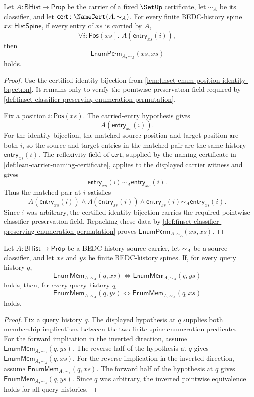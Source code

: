 \begin{theorem}
\label{thm:enumperm-identity-closure}
Let $A:\mathsf{BHist}\to\mathsf{Prop}$ be the carrier of a fixed $\SetUp$ certificate, let $\sim_A$ be its classifier, and let $\mathsf{cert}:\NameCert(A,\sim_A)$. For every finite BEDC-history spine $xs:\mathsf{HistSpine}$, if every entry of $xs$ is carried by $A$,
$$
\forall i:\mathsf{Pos}(xs).\;A(\mathsf{entry}_{xs}(i)),
$$
then
$$
\mathsf{EnumPerm}_{A,\sim_A}(xs,xs)
$$
holds.
\end{theorem}
\begin{proof}
Use the certified identity bijection from \autoref{lem:finset-enum-position-identity-bijection}. It remains only to verify the pointwise preservation field required by \autoref{def:finset-classifier-preserving-enumeration-permutation}.

Fix a position $i:\mathsf{Pos}(xs)$. The carried-entry hypothesis gives
$$
A(\mathsf{entry}_{xs}(i)).
$$
For the identity bijection, the matched source position and target position are both $i$, so the source and target entries in the matched pair are the same history $\mathsf{entry}_{xs}(i)$. The reflexivity field of $\mathsf{cert}$, supplied by the naming certificate in \autoref{def:lean-carrier-naming-certificate}, applies to the displayed carrier witness and gives
$$
\mathsf{entry}_{xs}(i)\sim_A\mathsf{entry}_{xs}(i).
$$
Thus the matched pair at $i$ satisfies
$$
A(\mathsf{entry}_{xs}(i))\land
A(\mathsf{entry}_{xs}(i))\land
\mathsf{entry}_{xs}(i)\sim_A\mathsf{entry}_{xs}(i).
$$
Since $i$ was arbitrary, the certified identity bijection carries the required pointwise classifier-preservation field. Repacking these data by \autoref{def:finset-classifier-preserving-enumeration-permutation} proves $\mathsf{EnumPerm}_{A,\sim_A}(xs,xs)$.
\end{proof}

\begin{lemma}
\label{lem:finset-enummem-pointwise-equivalence-symmetry}
Let $A:\mathsf{BHist}\to\mathsf{Prop}$ be a BEDC history source carrier, let $\sim_A$ be a source classifier, and let $xs$ and $ys$ be finite BEDC-history spines. If, for every query history $q$,
$$
\mathsf{EnumMem}_{A,\sim_A}(q,xs)
\Longleftrightarrow
\mathsf{EnumMem}_{A,\sim_A}(q,ys)
$$
holds, then, for every query history $q$,
$$
\mathsf{EnumMem}_{A,\sim_A}(q,ys)
\Longleftrightarrow
\mathsf{EnumMem}_{A,\sim_A}(q,xs)
$$
holds.
\end{lemma}
\begin{proof}
Fix a query history $q$. The displayed hypothesis at $q$ supplies both membership implications between the two finite-spine enumeration predicates. For the forward implication in the inverted direction, assume $\mathsf{EnumMem}_{A,\sim_A}(q,ys)$. The reverse half of the hypothesis at $q$ gives $\mathsf{EnumMem}_{A,\sim_A}(q,xs)$. For the reverse implication in the inverted direction, assume $\mathsf{EnumMem}_{A,\sim_A}(q,xs)$. The forward half of the hypothesis at $q$ gives $\mathsf{EnumMem}_{A,\sim_A}(q,ys)$. Since $q$ was arbitrary, the inverted pointwise equivalence holds for all query histories.
\end{proof}

